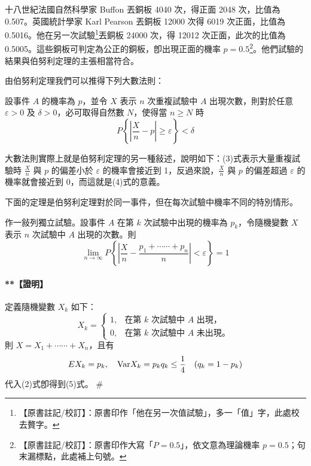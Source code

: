 \medskip
\begin{example}\label{ex:b5-5-17}
十八世紀法國自然科學家 Buffon 丟銅板 4040 次，得正面 2048 次，比值為 0.507。英國統計學家 Karl Pearson 丟銅板 12000 次得 6019 次正面，比值為 0.5016。他在另一次試驗\label{note:b5-ch5-p165-extra}\footnote{【原書註記/校訂】：原書印作「他在另一次值試驗」，多一「值」字，此處校去贅字。}丟銅板 24000 次，得 12012 次正面，此次的比值為 0.5005。這些銅板可判定為公正的銅板，卽出現正面的機率 $p = 0.5$\label{note:b5-ch5-p165-p}\footnote{【原書註記/校訂】：原書印作大寫「$P = 0.5$」，依文意為理論機率 $p = 0.5$；句末漏標點，此處補上句號。}。他們試驗的結果與伯努利定理的主張相當符合。
\end{example}

由伯努利定理我們可以推得下列大數法則：

\medskip
\begin{theorem*}[大數法則]
設事件 $A$ 的機率為 $p$，並令 $X$ 表示 $n$ 次重複試驗中 $A$ 出現次數，則對於任意 $\varepsilon > 0$ 及 $\delta > 0$，必可取得自然數 $N$，使得當 $n \ge N$ 時
\begin{equation}
P\left\{\left|\frac{X}{n} - p\right| \ge \varepsilon\right\} < \delta \tag{4}\label{eq:b5-5-3-4}
\end{equation}
\end{theorem*}

大數法則實際上就是伯努利定理的另一種敍述，說明如下：(3)式表示大量重複試驗時 $\frac{X}{n}$ 與 $p$ 的偏差小於 $\varepsilon$ 的機率會接近到 1，反過來說，$\frac{X}{n}$ 與 $p$ 的偏差超過 $\varepsilon$ 的機率就會接近到 0，而這就是(4)式的意義。

下面的定理是伯努利定理對於同一事件，但在每次試驗中機率不同的特別情形。

\medskip
\begin{theorem*}
作一敍列獨立試驗。設事件 $A$ 在第 $k$ 次試驗中出現的機率為 $p_k$，令隨機變數 $X$ 表示 $n$ 次試驗中 $A$ 出現的次數。則
\begin{equation}
\lim_{n \to \infty} P\left\{\left|\frac{X}{n} - \frac{p_1 + \cdots\cdots + p_n}{n}\right| < \varepsilon\right\} = 1 \tag{5}\label{eq:b5-5-3-5}
\end{equation}
\end{theorem*}
\paragraph{**【證明】}
定義隨機變數 $X_k$ 如下：
\[
X_k = \begin{cases} 1, & \text{在第 $k$ 次試驗中 $A$ 出現，} \\ 0, & \text{在第 $k$ 次試驗中 $A$ 未出現。} \end{cases}
\]
則 $X = X_1 + \cdots\cdots + X_n$，且有
\[
EX_k = p_k, \quad \text{Var} X_k = p_k q_k \le \frac{1}{4} \quad (q_k = 1 - p_k)
\]
代入(2)式卽得到(5)式。 \hfill\#

